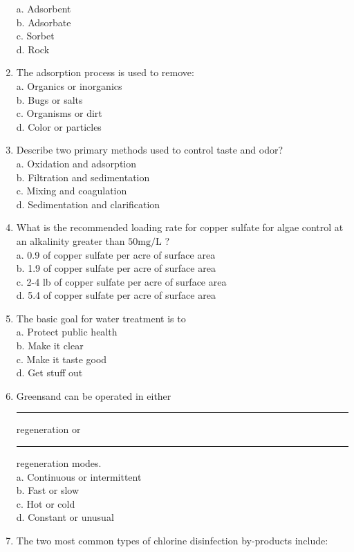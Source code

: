 \begin{enumerate}[1.]
a. Adsorbent\\
b. Adsorbate\\
c. Sorbet\\
d. Rock\\
\item The adsorption process is used to remove:\\
a. Organics or inorganics\\
b. Bugs or salts\\
c. Organisms or dirt\\
d. Color or particles\\
\item Describe two primary methods used to control taste and odor?\\
a. Oxidation and adsorption\\
b. Filtration and sedimentation\\
c. Mixing and coagulation\\
d. Sedimentation and clarification\\
\item What is the recommended loading rate for copper sulfate for algae control at an alkalinity greater than $50 \mathrm{mg} / \mathrm{L}$ ?\\
a. 0.9 of copper sulfate per acre of surface area\\
b. 1.9 of copper sulfate per acre of surface area\\
c. 2-4 lb of copper sulfate per acre of surface area\\
d. 5.4 of copper sulfate per acre of surface area\\
\item The basic goal for water treatment is to\\
a. Protect public health\\
b. Make it clear\\
c. Make it taste good\\
d. Get stuff out\\
\item Greensand can be operated in either \rule{1.5cm}{0.5pt} regeneration or \rule{1.5cm}{0.5pt} regeneration modes.\\
a. Continuous or intermittent\\
b. Fast or slow\\
c. Hot or cold\\
d. Constant or unusual\\
\item The two most common types of chlorine disinfection by-products include:\\

\end{enumerate}
